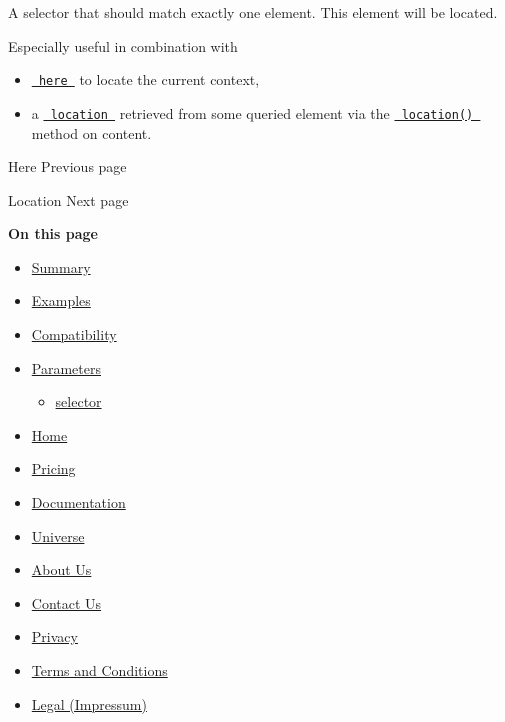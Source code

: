 A selector that should match exactly one element. This element will be
located.

Especially useful in combination with

\begin{itemize}
\tightlist
\item
  \href{/docs/reference/introspection/here/}{\texttt{\ here\ }} to
  locate the current context,
\item
  a
  \href{/docs/reference/introspection/location/}{\texttt{\ location\ }}
  retrieved from some queried element via the
  \href{/docs/reference/foundations/content/\#definitions-location}{\texttt{\ location()\ }}
  method on content.
\end{itemize}

\href{/docs/reference/introspection/here/}{\pandocbounded{}}

{ Here } { Previous page }

\href{/docs/reference/introspection/location/}{\pandocbounded{}}

{ Location } { Next page }

\textbf{On this page}

\begin{itemize}
\tightlist
\item
  \hyperref[summary]{Summary}
\item
  \hyperref[examples]{Examples}
\item
  \hyperref[compatibility]{Compatibility}
\item
  \hyperref[parameters]{Parameters}

  \begin{itemize}
  \tightlist
  \item
    \hyperref[parameters-selector]{selector}
  \end{itemize}
\end{itemize}

\begin{itemize}
\tightlist
\item
  \href{/}{Home}
\item
  \href{/pricing/}{Pricing}
\item
  \href{/docs/}{Documentation}
\item
  \href{/universe/}{Universe}
\item
  \href{/about/}{About Us}
\item
  \href{/contact/}{Contact Us}
\item
  \href{/privacy/}{Privacy}
\item
  \href{https://typst.app/terms}{Terms and Conditions}
\item
  \href{/legal/}{Legal (Impressum)}
\end{itemize}

